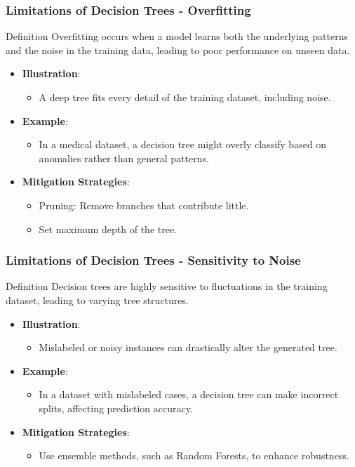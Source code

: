 \documentclass[aspectratio=169]{beamer}
\begin{document}
\begin{frame}[fragile]
    \frametitle{Limitations of Decision Trees - Overfitting}
    \begin{block}{Definition}
        Overfitting occurs when a model learns both the underlying patterns and the noise in the training data, leading to poor performance on unseen data.
    \end{block}
    \begin{itemize}
        \item \textbf{Illustration}:
        \begin{itemize}
            \item A deep tree fits every detail of the training dataset, including noise.
        \end{itemize}
        \item \textbf{Example}:
        \begin{itemize}
            \item In a medical dataset, a decision tree might overly classify based on anomalies rather than general patterns.
        \end{itemize}
        \item \textbf{Mitigation Strategies}:
        \begin{itemize}
            \item Pruning: Remove branches that contribute little.
            \item Set maximum depth of the tree.
        \end{itemize}
    \end{itemize}
\end{frame}

\begin{frame}[fragile]
    \frametitle{Limitations of Decision Trees - Sensitivity to Noise}
    \begin{block}{Definition}
        Decision trees are highly sensitive to fluctuations in the training dataset, leading to varying tree structures.
    \end{block}
    \begin{itemize}
        \item \textbf{Illustration}:
        \begin{itemize}
            \item Mislabeled or noisy instances can drastically alter the generated tree.
        \end{itemize}
        \item \textbf{Example}:
        \begin{itemize}
            \item In a dataset with mislabeled cases, a decision tree can make incorrect splits, affecting prediction accuracy.
        \end{itemize}
        \item \textbf{Mitigation Strategies}:
        \begin{itemize}
            \item Use ensemble methods, such as Random Forests, to enhance robustness.
        \end{itemize}
    \end{itemize}
\end{frame}
\end{document}
